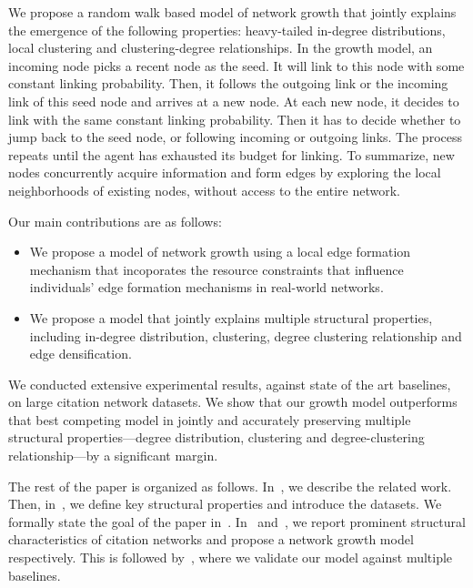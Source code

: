 We propose a random walk based model of network growth that jointly explains the
emergence of the following properties: heavy-tailed in-degree distributions,
local clustering and clustering-degree relationships. In the growth model, an
incoming node picks a recent node as the seed. It will link to this node with
some constant linking probability. Then, it follows the outgoing link or the
incoming link of this seed node and arrives at a new node. At each new node, it
decides to link with the same constant linking probability. Then it has to
decide whether to jump back to the seed node, or following incoming or outgoing
links. The process repeats until the agent has exhausted its budget for linking.
To summarize, new nodes concurrently acquire information and form edges
by exploring the local neighborhoods of existing nodes, without access to the
entire network.

Our main contributions are as follows:
\begin{itemize}
    \item We propose a model
    of network growth using a local edge formation mechanism that incoporates the
    resource constraints that influence individuals' edge formation mechanisms in
    real-world networks.
    \item We propose a model that jointly explains multiple
    structural properties, including in-degree distribution, clustering, degree
    clustering relationship and edge densification.
\end{itemize}


We conducted extensive experimental results, against state of the art
baselines, on large citation network datasets. We show that our growth model
outperforms that best competing model in jointly and accurately preserving
multiple structural properties---degree distribution, clustering and
degree-clustering relationship---by a significant margin.

The rest of the paper is organized as follows. In~, we
describe the related work. Then, in~, we define key
structural properties and introduce the datasets. We formally state the goal of
the paper in~. In~
and~, we report prominent structural characteristics
of citation networks and propose a network growth model respectively. This is
followed by~, where we validate our model against
multiple baselines.